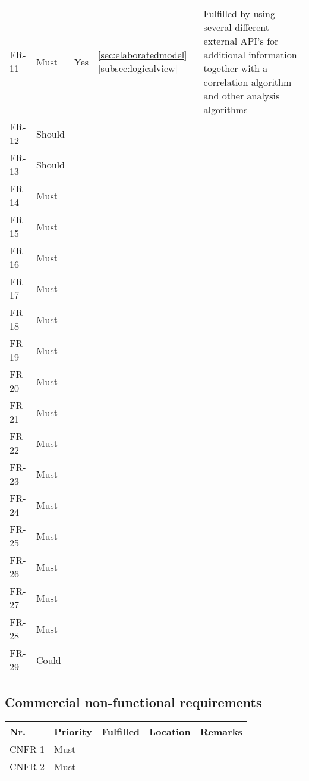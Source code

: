 \begin{table}[H]
\begin{tabular}{llllL{0.5\textwidth}}
		FR-11 & Must     & Yes & \ref{sec:elaboratedmodel} \ref{subsec:logicalview}  & Fulfilled by using several different external API's for additional information together with a correlation algorithm and other analysis algorithms \\ 
		FR-12 & Should   & ~        & ~         & ~       \\ 
		FR-13 & Should   & ~        & ~         & ~       \\ 
		FR-14 & Must     & ~        & ~         & ~       \\ 
		FR-15 & Must     & ~        & ~         & ~       \\ 
		FR-16 & Must     & ~        & ~         & ~       \\ 
		FR-17 & Must     & ~        & ~         & ~       \\ 
		FR-18 & Must     & ~        & ~         & ~       \\ 
		FR-19 & Must     & ~        & ~         & ~       \\ 
		FR-20 & Must     & ~        & ~         & ~       \\ 
		FR-21 & Must     & ~        & ~         & ~       \\ 
		FR-22 & Must     & ~        & ~         & ~       \\ 
		FR-23 & Must     & ~        & ~         & ~       \\ 
		FR-24 & Must     & ~        & ~         & ~       \\ 
		FR-25 & Must     & ~        & ~         & ~       \\ 
		FR-26 & Must     & ~        & ~         & ~       \\ 
		FR-27 & Must     & ~        & ~         & ~       \\ 
		FR-28 & Must     & ~        & ~         & ~       \\ 
		FR-29 & Could    & ~        & ~         & ~       \\
						
	\end{tabular}
\end{table}

\subsection{Commercial non-functional requirements}
\begin{table}[H]
	\begin{tabular}{lllll}
						    
		Nr.    & Priority & Fulfilled & Location & Remarks \\ \hline
		CNFR-1 & Must     & ~        & ~         & ~       \\ 
		CNFR-2 & Must     & ~        & ~         & ~       \\
						
	\end{tabular}
\end{table}

